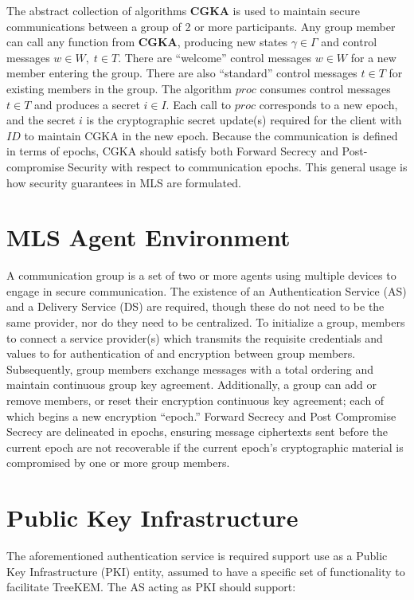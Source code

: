 \documentclass[12pt,twocolumn]{article}
\begin{document}
	The abstract collection of algorithms \textbf{CGKA} is used to maintain secure communications between a group of 2 or more participants.
	Any group member can call any function from \textbf{CGKA}, producing new states $\gamma \in \Gamma$ and control messages $w \in W,\; t \in T$.
	There are ``welcome'' control messages $w \in W$ for a new member entering the group.
	There are also ``standard'' control messages $t \in T$ for existing members in the group.
	The algorithm $proc$ consumes control messages $t \in T$ and produces a secret $i \in I$. 
	Each call to $proc$ corresponds to a new epoch, and the secret $i$ is the cryptographic secret update(s) required for the client with $ID$ to maintain CGKA in the new epoch.
	Because the communication is defined in terms of epochs, CGKA should satisfy both Forward Secrecy and Post-compromise Security with respect to communication epochs.
	This general usage is how security guarantees in MLS are formulated.

	
	\section*{MLS Agent Environment}
	
	A communication group is a set of two or more agents using multiple devices to engage in secure communication.
	The existence of an Authentication Service (AS) and a Delivery Service (DS) are required, though these do not need to be the same provider, nor do they need to be centralized.
	To initialize a group, members to connect a service provider(s) which transmits the requisite credentials and values to for authentication of and encryption between group members.
	Subsequently, group members exchange messages with a total ordering and maintain continuous group key agreement.
	Additionally, a group can add or remove members, or reset their encryption continuous key agreement; each of which begins a new encryption ``epoch.''
	Forward Secrecy and Post Compromise Secrecy are delineated in epochs, ensuring message ciphertexts sent before the current epoch are not recoverable if the current epoch's cryptographic material is compromised by one or more group members.
	
	\section*{Public Key Infrastructure}
	
	The aforementioned authentication service is required support use as a Public Key Infrastructure (PKI) entity, assumed to have a specific set of functionality to facilitate TreeKEM.
	The AS acting as PKI should support:
	
\end{document}

